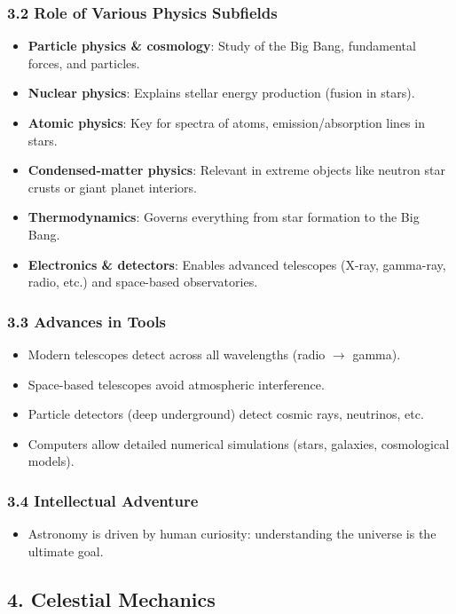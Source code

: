 \subsubsection{3.2 Role of Various Physics Subfields}
\begin{itemize}
  \item \textbf{Particle physics \& cosmology}: Study of the Big Bang, fundamental forces, and particles.
  \item \textbf{Nuclear physics}: Explains stellar energy production (fusion in stars).
  \item \textbf{Atomic physics}: Key for spectra of atoms, emission/absorption lines in stars.
  \item \textbf{Condensed-matter physics}: Relevant in extreme objects like neutron star crusts or giant planet interiors.
  \item \textbf{Thermodynamics}: Governs everything from star formation to the Big Bang.
  \item \textbf{Electronics \& detectors}: Enables advanced telescopes (X-ray, gamma-ray, radio, etc.) and space-based observatories.
\end{itemize}

\subsubsection{3.3 Advances in Tools}
\begin{itemize}
  \item Modern telescopes detect across all wavelengths (radio $\rightarrow$ gamma).
  \item Space-based telescopes avoid atmospheric interference.
  \item Particle detectors (deep underground) detect cosmic rays, neutrinos, etc.
  \item Computers allow detailed numerical simulations (stars, galaxies, cosmological models).
\end{itemize}

\subsubsection{3.4 Intellectual Adventure}
\begin{itemize}
  \item Astronomy is driven by human curiosity: understanding the universe is the ultimate goal.
\end{itemize}

\subsection{4. Celestial Mechanics}

